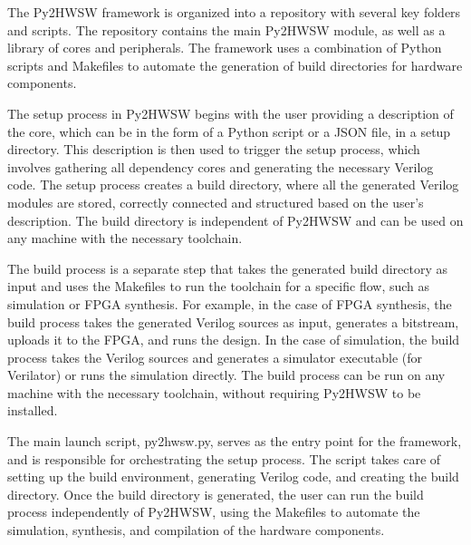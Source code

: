 %

The Py2HWSW framework is organized into a repository with several key folders and scripts. The repository contains the main Py2HWSW module, as well as a library of cores and peripherals. The framework uses a combination of Python scripts and Makefiles to automate the generation of build directories for hardware components.

The setup process in Py2HWSW begins with the user providing a description of the core, which can be in the form of a Python script or a JSON file, in a setup directory. This description is then used to trigger the setup process, which involves gathering all dependency cores and generating the necessary Verilog code. The setup process creates a build directory, where all the generated Verilog modules are stored, correctly connected and structured based on the user's description. The build directory is independent of Py2HWSW and can be used on any machine with the necessary toolchain.

The build process is a separate step that takes the generated build directory as input and uses the Makefiles to run the toolchain for a specific flow, such as simulation or FPGA synthesis. For example, in the case of FPGA synthesis, the build process takes the generated Verilog sources as input, generates a bitstream, uploads it to the FPGA, and runs the design. In the case of simulation, the build process takes the Verilog sources and generates a simulator executable (for Verilator) or runs the simulation directly. The build process can be run on any machine with the necessary toolchain, without requiring Py2HWSW to be installed.

The main launch script, py2hwsw.py, serves as the entry point for the framework, and is responsible for orchestrating the setup process. The script takes care of setting up the build environment, generating Verilog code, and creating the build directory. Once the build directory is generated, the user can run the build process independently of Py2HWSW, using the Makefiles to automate the simulation, synthesis, and compilation of the hardware components.
